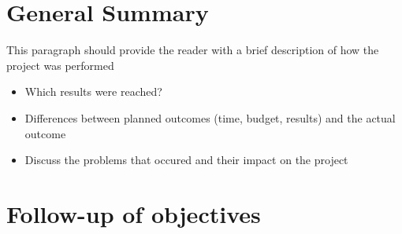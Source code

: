\documentclass[11pt, titlepage]{article} %
\begin{document}
\begin{titlepage}
	
	 
	
	\vfill %
	
\end{titlepage}


\clearpage

\section{General Summary}
This paragraph should provide the reader with a brief description of how the project was performed
\begin{itemize}
    \item Which results were reached?
    \item Differences between planned outcomes (time, budget, results) and the actual outcome
    \item Discuss the problems that occured and their impact on the project
\end{itemize}


\section{Follow-up of objectives}
\end{document}
